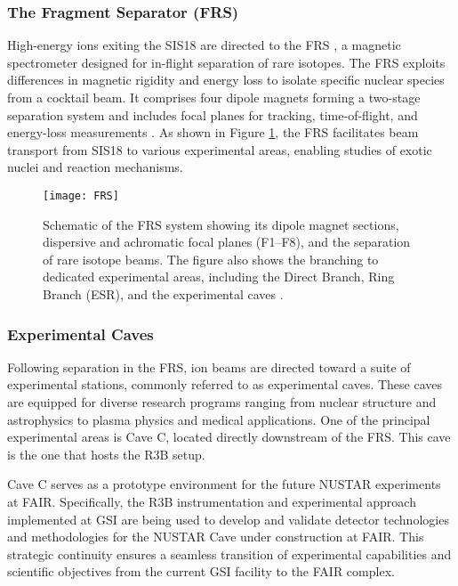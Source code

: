 \subsubsection{The Fragment Separator (FRS)}

High-energy ions exiting the SIS18 are directed to the \gls{FRS} \cite{geissel_experiments_2008}, a magnetic spectrometer designed for in-flight separation of rare isotopes. The FRS exploits differences in magnetic rigidity and energy loss to isolate specific nuclear species from a cocktail beam. It comprises four dipole magnets forming a two-stage separation system and includes focal planes for tracking, time-of-flight, and energy-loss measurements . As shown in Figure \ref{fig:FRS}, the FRS facilitates beam transport from SIS18 to various experimental areas, enabling studies of exotic nuclei and reaction mechanisms.


\begin{figure}
	\texttt{[image: FRS]}
	\caption{Schematic of the FRS system showing its dipole magnet sections, dispersive and achromatic focal planes (F1–F8), and the separation of rare isotope beams. The figure also shows the branching to dedicated experimental areas, including the Direct Branch, Ring Branch (ESR), and the experimental caves \cite{gsiWebHomelt}.}
	\label{fig:FRS}
\end{figure}


\subsubsection{Experimental Caves}

Following separation in the \gls{FRS}, ion beams are directed toward a suite of experimental stations, commonly referred to as experimental caves. These caves are equipped for diverse research programs ranging from nuclear structure and astrophysics to plasma physics and medical applications. One of the principal experimental areas is Cave C, located directly downstream of the FRS. This cave is the one that hosts the \gls{R3B} setup.

Cave C serves as a prototype environment for the future NUSTAR experiments at \gls{FAIR}. Specifically, the \gls{R3B} instrumentation and experimental approach implemented at GSI are being used to develop and validate detector technologies and methodologies for the NUSTAR Cave under construction at \gls{FAIR}. This strategic continuity ensures a seamless transition of experimental capabilities and scientific objectives from the current GSI facility to the \gls{FAIR} complex.

